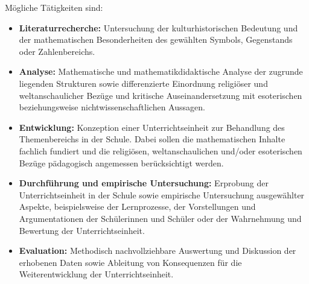 \documentclass{cssheet}
\begin{document}
Mögliche Tätigkeiten sind:

\begin{itemize}
\item \textbf{Literaturrecherche:} Untersuchung der kulturhistorischen Bedeutung und der mathematischen Besonderheiten des gewählten Symbols, Gegenstands oder Zahlenbereichs.

\item \textbf{Analyse:} Mathematische und mathematikdidaktische Analyse der zugrunde liegenden Strukturen sowie differenzierte Einordnung religiöser und weltanschaulicher Bezüge und kritische Auseinandersetzung mit esoterischen beziehungsweise nichtwissenschaftlichen Aussagen.

\item \textbf{Entwicklung:} Konzeption einer Unterrichtseinheit zur Behandlung des Themenbereichs in der Schule. Dabei sollen die mathematischen Inhalte fachlich fundiert und die religiösen, weltanschaulichen und/oder esoterischen Bezüge pädagogisch angemessen berücksichtigt werden.

\item \textbf{Durchführung und empirische Untersuchung:} Erprobung der Unterrichtseinheit in der Schule sowie empirische Untersuchung ausgewählter Aspekte, beispielsweise der Lernprozesse, der Vorstellungen und Argumentationen der Schülerinnen und Schüler oder der Wahrnehmung und Bewertung der Unterrichtseinheit.

\item \textbf{Evaluation:} Methodisch nachvollziehbare Auswertung und Diskussion der erhobenen Daten sowie Ableitung von Konsequenzen für die Weiterentwicklung der Unterrichtseinheit.
\end{itemize}

\vspace*{10mm}

\printlicense
\end{document}
